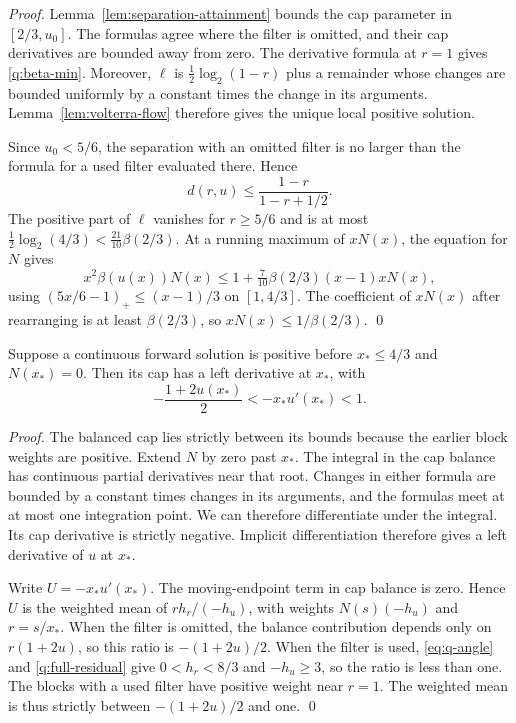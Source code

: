 \documentclass[runningheads,envcountsame,envcountsect,orivec]{llncs}
\begin{document}
\begin{proof}
Lemma~\ref{lem:separation-attainment} bounds the cap parameter
in $[2/3,u_0]$. The formulas agree where the filter is omitted, and their cap
derivatives are bounded away from zero. The derivative formula at $r=1$ gives \eqref{q:beta-min}. Moreover,
$\ell$ is $\tfrac12\log_2(1-r)$ plus a remainder whose changes are bounded uniformly by a constant
times the change in its arguments. Lemma~\ref{lem:volterra-flow} therefore gives
the unique local positive solution.

Since $u_0<5/6$, the separation with an omitted filter is no
larger than the formula for a used filter evaluated there. Hence
\[
 d(r,u)\le\frac{1-r}{1-r+1/2}.
\]
The positive part of $\ell$ vanishes for $r\ge5/6$ and is
at most $\tfrac12\log_2(4/3)<\tfrac{21}{10}\beta(2/3)$.
At a running maximum of $xN(x)$, the equation for $N$ gives
\[
 x^2\beta(u(x))N(x)
 \le1+\tfrac7{10}\beta(2/3)(x-1)xN(x),
\]
using $(5x/6-1)_+\le(x-1)/3$ on $[1,4/3]$.
The coefficient of $xN(x)$ after rearranging is at least
$\beta(2/3)$, so $xN(x)\le1/\beta(2/3)$.
\qed
\end{proof}

\begin{lemma}
\label{lem:q-cap-slope}
Suppose a continuous forward solution is positive before
$x_*\le4/3$ and $N(x_*)=0$. Then its cap has a left
derivative at $x_*$, with
\[
 -\frac{1+2u(x_*)}{2}<-x_*u'(x_*)<1.
\]
\end{lemma}

\begin{proof}
The balanced cap lies strictly between its bounds because
the earlier block weights are positive. Extend $N$ by zero past $x_*$.
The integral in the cap balance has continuous partial
derivatives near that root. Changes in either formula are
bounded by a constant times changes in its arguments, and
the formulas meet at at most one integration point. We can
therefore differentiate under the integral. Its cap derivative is strictly negative.
Implicit differentiation therefore gives a left derivative
of $u$ at $x_*$.

Write $U=-x_*u'(x_*)$. The moving-endpoint term in cap
balance is zero. Hence $U$ is the weighted mean of
$rh_r/(-h_u)$, with weights $N(s)(-h_u)$ and $r=s/x_*$.
When the filter is omitted, the balance contribution depends only on
$r(1+2u)$, so this ratio is $-(1+2u)/2$.
When the filter is used, \eqref{eq:q-angle} and
\eqref{q:full-residual} give $0<h_r<8/3$ and $-h_u\ge3$,
so the ratio is less than one. The blocks with a used filter have
positive weight near $r=1$. The weighted mean is thus
strictly between $-(1+2u)/2$ and one.
\qed
\end{proof}
\end{document}
